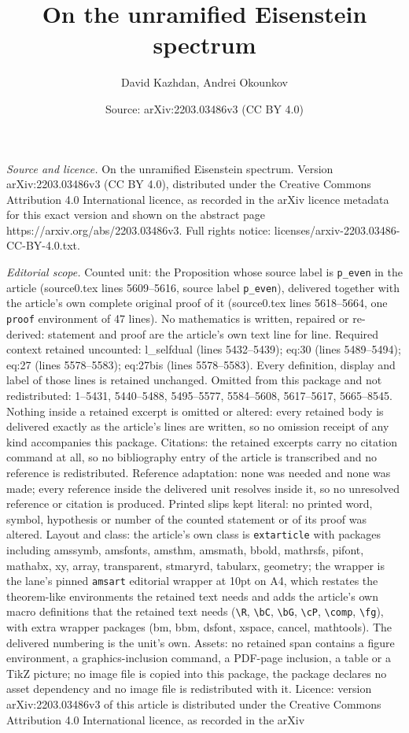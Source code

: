 \documentclass[10pt,a4paper]{amsart}
\title[On the unramified Eisenstein spectrum]{On the unramified Eisenstein spectrum}
\author{David Kazhdan, Andrei Okounkov}
\date{Source: arXiv:2203.03486v3 (CC BY 4.0)}
\begin{document}
\maketitle

\noindent\emph{Source and licence.} On the unramified Eisenstein spectrum. Version arXiv:2203.03486v3 (CC BY 4.0), distributed under the Creative Commons Attribution 4.0 International licence, as recorded in the arXiv licence metadata for this exact version and shown on the abstract page https://arxiv.org/abs/2203.03486v3. Full rights notice: licenses/arxiv-2203.03486-CC-BY-4.0.txt.\par\smallskip

\noindent\textit{Editorial scope.} Counted unit: the Proposition whose source label is \texttt{p\_even} in the article (source0.tex lines 5609--5616, source label \texttt{p\_even}), delivered together with the article's own complete original proof of it (source0.tex lines 5618--5664, one \texttt{proof} environment of 47 lines). No mathematics is written, repaired or re-derived: statement and proof are the article's own text line for line. Required context retained uncounted: l\_selfdual (lines 5432--5439); eq:30 (lines 5489--5494); eq:27 (lines 5578--5583); eq:27bis (lines 5578--5583). Every definition, display and label of those lines is retained unchanged. Omitted from this package and not redistributed: 1--5431, 5440--5488, 5495--5577, 5584--5608, 5617--5617, 5665--8545. Nothing inside a retained excerpt is omitted or altered: every retained body is delivered exactly as the article's lines are written, so no omission receipt of any kind accompanies this package. Citations: the retained excerpts carry no citation command at all, so no bibliography entry of the article is transcribed and no reference is redistributed. Reference adaptation: none was needed and none was made; every reference inside the delivered unit resolves inside it, so no unresolved reference or citation is produced. Printed slips kept literal: no printed word, symbol, hypothesis or number of the counted statement or of its proof was altered. Layout and class: the article's own class is \texttt{extarticle} with packages including amssymb, amsfonts, amsthm, amsmath, bbold, mathrsfs, pifont, mathabx, xy, array, transparent, stmaryrd, tabularx, geometry; the wrapper is the lane's pinned \texttt{amsart} editorial wrapper at 10pt on A4, which restates the theorem-like environments the retained text needs and adds the article's own macro definitions that the retained text needs (\texttt{\textbackslash R}, \texttt{\textbackslash bC}, \texttt{\textbackslash bG}, \texttt{\textbackslash cP}, \texttt{\textbackslash comp}, \texttt{\textbackslash fg}), with extra wrapper packages (bm, bbm, dsfont, xspace, cancel, mathtools). The delivered numbering is the unit's own. Assets: no retained span contains a figure environment, a graphics-inclusion command, a PDF-page inclusion, a table or a TikZ picture; no image file is copied into this package, the package declares no asset dependency and no image file is redistributed with it. Licence: version arXiv:2203.03486v3 of this article is distributed under the Creative Commons Attribution 4.0 International licence, as recorded in the arXiv 
\end{document}
